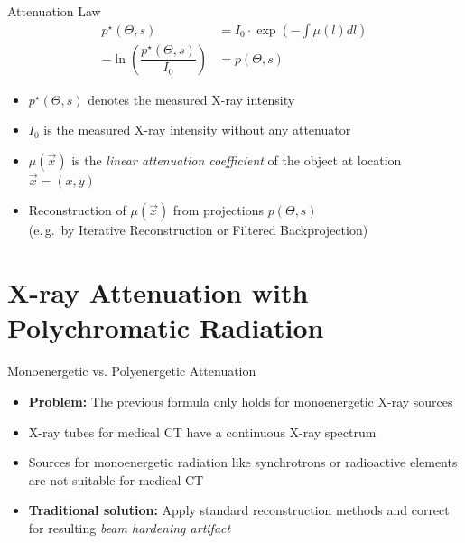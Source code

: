 \begin{frame}{Attenuation Law}
    \begin{align*}
        p^{\star}(\Theta, s)                               & = I_0 \cdot \exp\left(-\int	\mu(l)dl\right) \\
        -\ln\left(\dfrac{p^{\star}(\Theta, s)}{I_0}\right) & = p(\Theta, s) \tag{Radon transform}
    \end{align*}
    \begin{itemize}
        \item $p^{\star}(\Theta, s)$ denotes the measured X-ray intensity
        \item $I_0$ is the measured X-ray intensity without any attenuator
        \item $\mu(\vec x)$ is the \textit{linear attenuation coefficient} of the object at location $\vec x = (x ,y)$
        \item Reconstruction of $\mu(\vec x)$ from projections $p(\Theta, s)$\\ (e.\,g.\ by Iterative Reconstruction or Filtered Backprojection)
    \end{itemize}
\end{frame}


\section{X-ray Attenuation with Polychromatic Radiation}

\begin{frame}[c]{Monoenergetic vs. Polyenergetic Attenuation}
    \begin{itemize}
        \setlength\itemsep{0.4cm}
        \item \textbf{Problem:} The previous formula only holds for monoenergetic X-ray sources
        \item X-ray tubes for medical CT have a continuous X-ray spectrum
        \item Sources for monoenergetic radiation like synchrotrons or radioactive elements are not suitable for medical CT
        \item \textbf{Traditional solution:} Apply standard reconstruction methods and correct for resulting \textit{beam hardening artifact}
    \end{itemize}
\end{frame}

